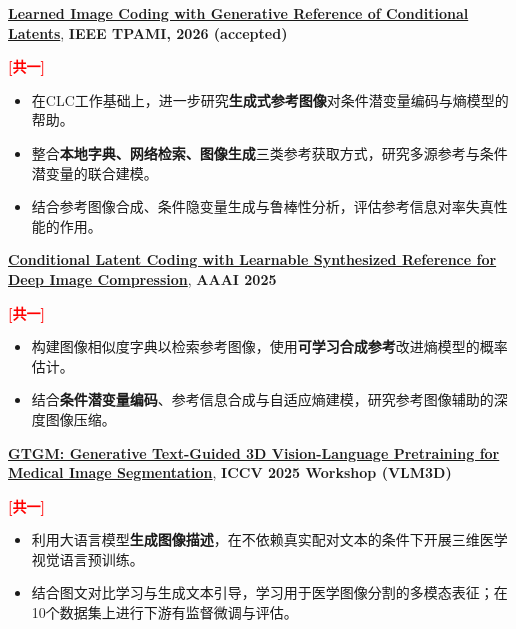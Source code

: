 \documentclass{resume}
\begin{document}
\begin{enumerate}[label=\textbf{[\arabic*]}, leftmargin=2em, itemsep=3pt]
    \item \kaishu \parbox[t]{0.88\linewidth}{\textbf{\href{https://doi.org/10.1109/TPAMI.2026.3744812}{Learned Image Coding with Generative Reference of Conditional Latents}}, \textbf{IEEE TPAMI, 2026 (accepted)}} \hfill \textcolor{red}{\textbf{[共一]}}
    \begin{itemize}
        \item 在CLC工作基础上，进一步研究\textbf{生成式参考图像}对条件潜变量编码与熵模型的帮助。
        \item 整合\textbf{本地字典、网络检索、图像生成}三类参考获取方式，研究多源参考与条件潜变量的联合建模。
        \item 结合参考图像合成、条件隐变量生成与鲁棒性分析，评估参考信息对率失真性能的作用。
    \end{itemize}

    \item \kaishu \parbox[t]{0.88\linewidth}{\textbf{\href{https://doi.org/10.1609/aaai.v39i12.33403}{Conditional Latent Coding with Learnable Synthesized Reference for Deep Image Compression}}, \textbf{AAAI 2025}} \hfill \textcolor{red}{\textbf{[共一]}}
    \begin{itemize}
        \item 构建图像相似度字典以检索参考图像，使用\textbf{可学习合成参考}改进熵模型的概率估计。
        \item 结合\textbf{条件潜变量编码}、参考信息合成与自适应熵建模，研究参考图像辅助的深度图像压缩。
    \end{itemize}

    \item \kaishu \parbox[t]{0.88\linewidth}{\textbf{\href{https://openaccess.thecvf.com/content/ICCV2025W/VLM3D/html/Chen_GTGM_Generative_Text-Guided_3D_Vision-Language_Pretraining_for_Medical_Image_Segmentation_ICCVW_2025_paper.html}{GTGM: Generative Text-Guided 3D Vision-Language Pretraining for Medical Image Segmentation}}, \textbf{ICCV 2025 Workshop (VLM3D)}} \hfill \textcolor{red}{\textbf{[共一]}}
    \begin{itemize}
        \item 利用大语言模型\textbf{生成图像描述}，在不依赖真实配对文本的条件下开展三维医学视觉语言预训练。
        \item 结合图文对比学习与生成文本引导，学习用于医学图像分割的多模态表征；在10个数据集上进行下游有监督微调与评估。
    \end{itemize}


\end{enumerate}
\end{document}
